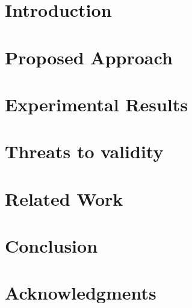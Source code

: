 	\author{
	}
	
	\maketitle
	

	\begin{abstract}
		\label{sec:abstract}
		
	\end{abstract}


\section{Introduction}
\label{sec:introduction}




\section{Proposed Approach}
\label{sec:framework}


\section{Experimental Results}
\label{sec:exp_results}


\section{Threats to validity}
\label{sec:threats}



\section{Related Work}
\label{sec:relatedwork}


\section{Conclusion}
\label{sec:conclusion}


\section{Acknowledgments}
\label{sec:acknowledgments}


%

\balance

\let\oldthebibliography=\thebibliography
\let\endoldthebibliography=\endthebibliography
\renewenvironment{thebibliography}[1]{%
	\vspace{0pt}
	\begin{oldthebibliography}{#1}%
		\fontsize{7.0}{7.5}\selectfont
		\setlength{\parskip}{0ex}%
		\setlength{\itemsep}{0.5ex}%
	}%
	{%
	\end{oldthebibliography}%
}
{\scriptsize
	\def\baselinestretch{0.95}
	
	
}

